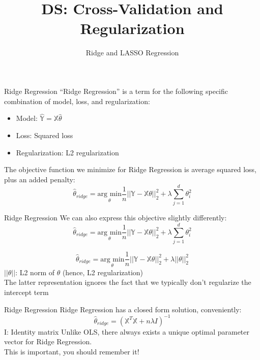 \documentclass[aspectratio=169]{../latex_main/tntbeamer}  %
\title[Introduction]{DS: Cross-Validation and Regularization}
\subtitle{Ridge and LASSO Regression}
\begin{document}
	
	\maketitle
	\begin{frame}{Ridge Regression}
	    “Ridge Regression” is a term for the following specific combination of model, loss, and regularization:
	    \begin{itemize}
	        \item Model: $\mathbb{\hat{Y}} = \mathbb{X}\hat{\theta}$
	        \item Loss: Squared loss
	        \item Regularization: L2 regularization
	    \end{itemize}
	    The objective function we minimize for Ridge Regression is average squared loss, plus an added penalty:
	    \begin{equation*}
	        \hat{\theta}_{ridge} = \underset{\theta}{\text{arg min}}\frac{1}{n}||\mathbb{Y} - \mathbb{X}\theta||_2^2 + \lambda \sum\limits_{j=1}^d\theta_i^2 
	    \end{equation*}
	\end{frame}
	
	
	\begin{frame}{Ridge Regression}
	    We can also express this objective slightly differently:
	    \begin{equation*}
	        \hat{\theta}_{ridge} = \underset{\theta}{\text{arg min}}\frac{1}{n}||\mathbb{Y} - \mathbb{X}\theta||_2^2 + \lambda \sum\limits_{j=1}^d\theta_i^2 
	    \end{equation*}
	    
	    \begin{equation*}
	        \hat{\theta}_{ridge} = \underset{\theta}{\text{arg min}}\frac{1}{n}||\mathbb{Y} - \mathbb{X}\theta||_2^2 + \lambda ||\theta ||_2^2
	    \end{equation*}
	    $||\theta ||$: L2 norm of $\theta$ (hence, L2 regularization)\\
	    \bigskip
	    The latter representation ignores the fact that we typically don’t regularize the intercept term
	\end{frame}
	
	
	\begin{frame}[c]{Ridge Regression}
	    Ridge Regression has a closed form solution, conveniently:
	    \begin{equation*}
	        \hat{\theta}_{ridge} = (\mathbb{X}^T\mathbb{X} + n\lambda I)^{-1} 
	    \end{equation*}
	    I: Identity matrix
	    Unlike OLS, there always exists a unique optimal parameter vector for Ridge Regression.\\
        This is important, you should remember it!

	\end{frame}
	
\end{document}
